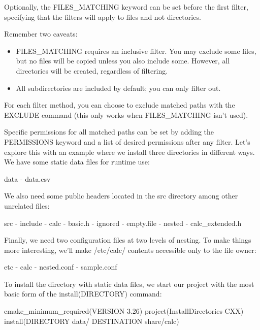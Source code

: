 Optionally, the FILES\_MATCHING keyword can be set before the first filter, specifying that the filters will apply to files and not directories.

Remember two caveats:

\begin{itemize}
\item
FILES\_MATCHING requires an inclusive filter. You may exclude some files, but no files will be copied unless you also include some. However, all directories will be created, regardless of filtering.

\item
All subdirectories are included by default; you can only filter out.
\end{itemize}

For each filter method, you can choose to exclude matched paths with the EXCLUDE command (this only works when FILES\_MATCHING isn’t used).

Specific permissions for all matched paths can be set by adding the PERMISSIONS keyword and a list of desired permissions after any filter. Let’s explore this with an example where we install three directories in different ways. We have some static data files for runtime use:

\begin{shell}
data
- data.csv
\end{shell}

We also need some public headers located in the src directory among other unrelated files:

\begin{shell}
src
- include
  - calc
    - basic.h
    - ignored
      - empty.file
    - nested
      - calc_extended.h
\end{shell}

Finally, we need two configuration files at two levels of nesting. To make things more interesting, we’ll make /etc/calc/ contents accessible only to the file owner:

\begin{shell}
etc
- calc
  - nested.conf
- sample.conf
\end{shell}

To install the directory with static data files, we start our project with the most basic form of the install(DIRECTORY) command:


\begin{cmake}
cmake_minimum_required(VERSION 3.26)
project(InstallDirectories CXX)
install(DIRECTORY data/ DESTINATION share/calc)
\end{cmake}

